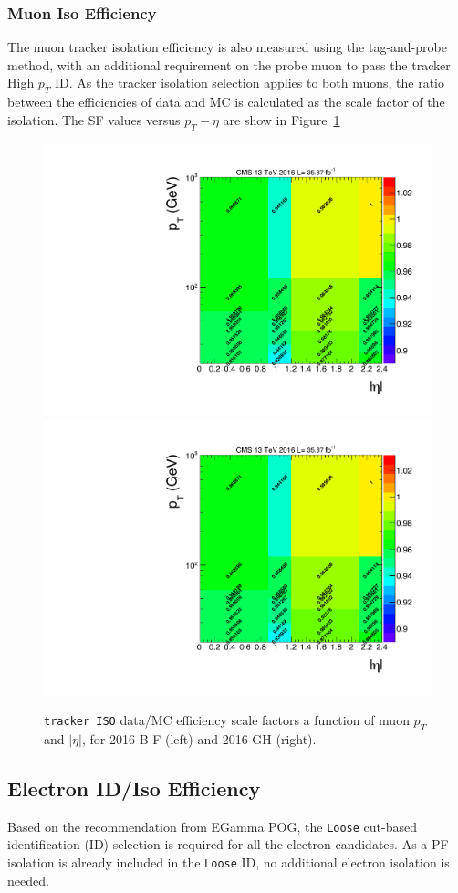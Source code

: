 \subsubsection{Muon Iso Efficiency}
The muon tracker isolation efficiency is also measured using the tag-and-probe method, with an additional requirement on the probe muon to pass the tracker High $p_T$ ID. As the tracker isolation selection applies to both muons, the ratio between the efficiencies of data and MC is calculated as the scale factor of the isolation. The SF values versus $p_T - \eta$ are show in Figure~\ref{fig:bg_muonisosf}
\begin{figure}[htbp]
\begin{center}
\includegraphics[width=0.49\linewidth, page=7]{figures/bg_muonidisoeff.pdf}
\includegraphics[width=0.49\linewidth, page=8]{figures/bg_muonidisoeff.pdf}
\caption{\texttt{tracker ISO} data/MC efficiency scale factors a function of muon $p_T$ and $|\eta|$, for 2016 B-F (left) and 2016 GH (right).}
\label{fig:bg_muonisosf}
\end{center}
\end{figure}

\subsection{Electron ID/Iso Efficiency}
Based on the recommendation from EGamma POG, the \texttt{Loose} cut-based identification (ID) selection is required for all the electron candidates. As a PF isolation is already included in the \texttt{Loose} ID, no additional electron isolation is needed.


